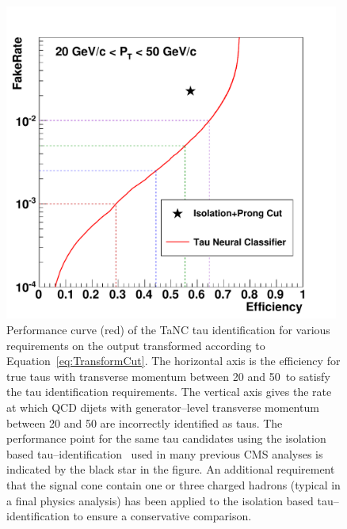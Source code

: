 \begin{figure}[thbp]
   \setlength{\unitlength}{1mm}
   \includegraphics*[width=0.98\textwidth]{tanc_chapter/figures/20_pt_50_perf_curve_from_5_pt_200_transform_plain_test_wrt_classic.pdf}
   \begin{center}
   \caption[Tau Neural Classifier performance comparison]{Performance curve (red) of the TaNC tau identification for various
   requirements on the output transformed according to
   Equation~\ref{eq:TransformCut}.  The horizontal axis is the efficiency for
   true taus with transverse momentum between 20 and 50~\GeVc to satisfy the tau
   identification requirements.  The vertical axis gives the rate at which QCD
   dijets with generator--level transverse momentum between 20 and 50 \GeVc
   are incorrectly identified as taus.  The performance point for the same
   tau candidates using the isolation based tau--identification~\cite{CMS-PAS-PFT-08-001}
   used in many previous CMS analyses is indicated by the black star in the
   figure.  An additional requirement that the signal cone contain one or three
   charged hadrons (typical in a final physics analysis) has been applied to the
   isolation based tau--identification to ensure a conservative comparison.  }
   \label{fig:finalPerfCurve}
   \end{center}
\end{figure}
%
%
